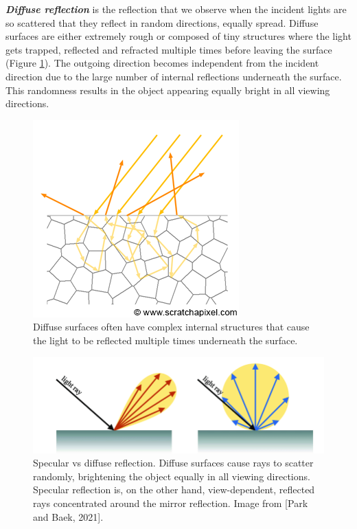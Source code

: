 

\textbf{\textit{Diffuse reflection}} is the reflection that we observe when the incident lights are so scattered that they reflect in random directions, equally spread. Diffuse surfaces are either extremely rough or composed of tiny structures where the light gets trapped, reflected and refracted multiple times before leaving the surface (Figure \ref{fig:diffuse-scattering}). The outgoing direction becomes independent from the incident direction due to the large number of internal reflections underneath the surface. This randomness results in the object appearing equally bright in all viewing directions. 

\begin{figure}
  \centering
   \includegraphics[width=0.5\linewidth]{Images/shad-diffuse1.png}
   \caption{Diffuse surfaces often have complex internal structures that cause the light to be reflected multiple times underneath the surface.}
   \label{fig:diffuse-scattering}
\end{figure}


\begin{figure}[h]
  \centering
   \includegraphics[width=0.7\linewidth]{Images/Differences-between-the-specular-and-diffuse-reflections-specuclar-reflections-occur-on.png}
   \caption{Specular vs diffuse reflection. Diffuse surfaces cause rays to scatter randomly, brightening the object equally in all viewing directions. Specular reflection is, on the other hand, view-dependent, reflected rays concentrated around the mirror reflection. Image from [Park and Baek, 2021].}
   \label{fig:specularvsdiffuse}
\end{figure}

